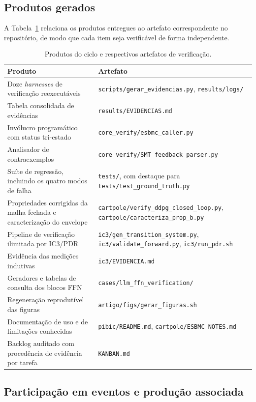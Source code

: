 \subsection{Produtos gerados}

A Tabela~\ref{tab:produtos} relaciona os produtos entregues ao artefato correspondente no
repositório, de modo que cada item seja verificável de forma independente.

\begin{table}[H]
\centering
\caption{Produtos do ciclo e respectivos artefatos de verificação.}
\label{tab:produtos}
\footnotesize
\begin{tabular}{@{}p{6.0cm}p{8.0cm}@{}}
\toprule
\textbf{Produto} & \textbf{Artefato} \\
\midrule
Doze \textit{harnesses} de verificação reexecutáveis &
\texttt{scripts/gerar\_evidencias.py}, \texttt{results/logs/} \\
Tabela consolidada de evidências &
\texttt{results/EVIDENCIAS.md} \\
Invólucro programático com status tri-estado &
\texttt{core\_verify/esbmc\_caller.py} \\
Analisador de contraexemplos &
\texttt{core\_verify/SMT\_feedback\_parser.py} \\
Suíte de regressão, incluindo os quatro modos de falha &
\texttt{tests/}, com destaque para \texttt{tests/test\_ground\_truth.py} \\
Propriedades corrigidas da malha fechada e caracterização do envelope &
\texttt{cartpole/verify\_ddpg\_closed\_loop.py},
\texttt{cartpole/caracteriza\_prop\_b.py} \\
Pipeline de verificação ilimitada por IC3/PDR &
\texttt{ic3/gen\_transition\_system.py}, \texttt{ic3/validate\_forward.py},
\texttt{ic3/run\_pdr.sh} \\
Evidência das medições indutivas &
\texttt{ic3/EVIDENCIA.md} \\
Geradores e tabelas de consulta dos blocos FFN &
\texttt{cases/llm\_ffn\_verification/} \\
Regeneração reprodutível das figuras &
\texttt{artigo/figs/gerar\_figuras.sh} \\
Documentação de uso e de limitações conhecidas &
\texttt{pibic/README.md}, \texttt{cartpole/ESBMC\_NOTES.md} \\
Backlog auditado com procedência de evidência por tarefa &
\texttt{KANBAN.md} \\
\bottomrule
\end{tabular}
\end{table}

\subsection{Participação em eventos e produção associada}

